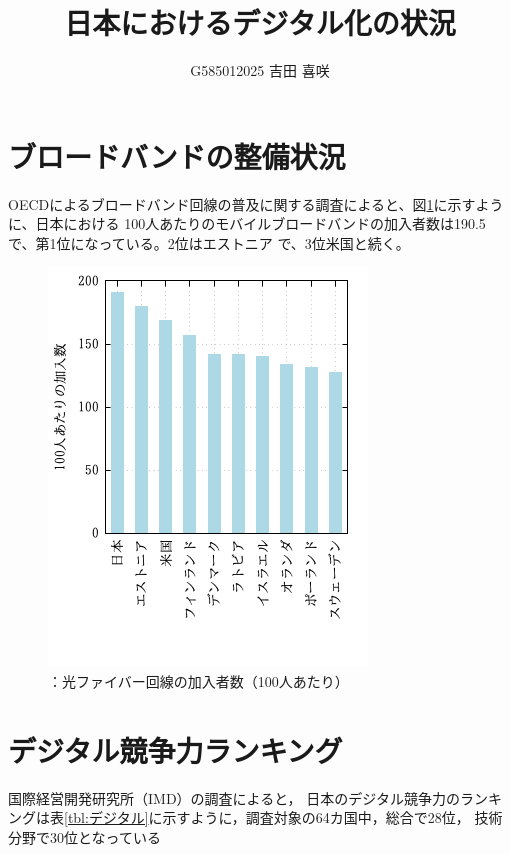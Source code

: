 \documentclass[a4paper,11pt,dvipdfmx]{ujarticle}
\title{日本におけるデジタル化の状況}
\author{G585012025 吉田 喜咲}
\begin{document}
\maketitle 

\section{ブロードバンドの整備状況}

OECDによるブロードバンド回線の普及に関する調査\cite{oecd}によると、図\ref{fig21.png}に示すように、日本における
 100人あたりのモバイルブロードバンドの加入者数は190.5で、第1位になっている。2位はエストニア
で、3位米国と続く。

\begin{figure}[htbp]
    \centering
    \includegraphics[width=0.5\linewidth]{fig21.png}
    \caption{：光ファイバー回線の加入者数（100人あたり）}\label{fig21.png}
\end{figure}

\section{デジタル競争力ランキング}

国際経営開発研究所（IMD）の調査\cite{imd}によると，
日本のデジタル競争力のランキングは表\ref{tbl:デジタル}に示すように，調査対象の64カ国中，総合で28位，
技術分野で30位となっている
\end{document}

